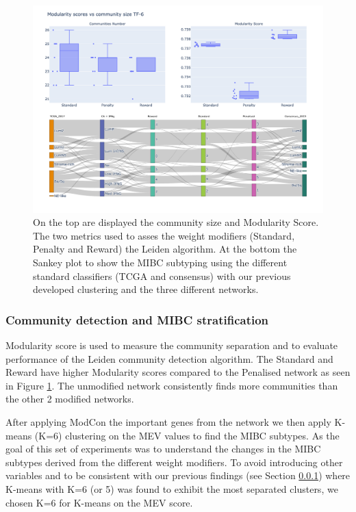 \begin{figure}[!htb]    \centering\includegraphics[width=1.0\textwidth,height=0.6\textheight,keepaspectratio]{Sections/Network_I/Resources/Tum_network/LeidenMetrics_Sankey_TF-6.png}
    \caption{On the top are displayed the community size and Modularity Score. The two metrics used to asses the weight modifiers (Standard, Penalty and Reward) the Leiden algorithm. At the bottom the Sankey plot to show the MIBC subtyping using the different standard classifiers (TCGA and consensus) with our previous developed clustering and the three different networks. }
    \label{fig:N_I:leiden_modifiers}
\end{figure}

\subsubsection{Community detection and MIBC stratification}

Modularity score is used to measure the community separation and to evaluate performance of the Leiden community detection algorithm. The Standard and Reward have higher Modularity scores compared to the Penalised network as seen in Figure \ref{fig:N_I:leiden_modifiers}. The unmodified network consistently finds more communities than the other 2 modified networks. 


After applying ModCon the important genes from the network we then apply K-means (K=6) clustering on the MEV values to find the MIBC subtypes. As the goal of this set of experiments was to understand the changes in the MIBC subtypes derived from the different weight modifiers. To avoid introducing other variables and to be consistent with our previous findings (see Section \ref{}) where K-means with K=6 (or 5) was found to exhibit the most separated clusters, we chosen K=6 for K-means on the MEV score. 

